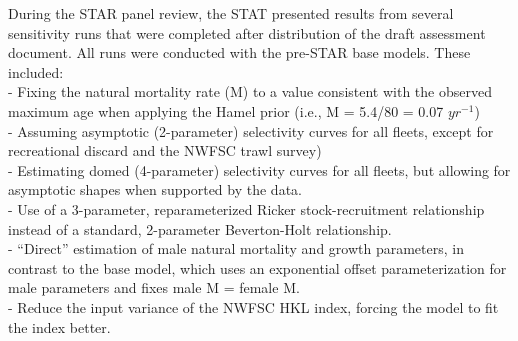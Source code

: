 \documentclass[
  english,
  a4paper,
]{article}
\begin{document}
During the STAR panel review, the STAT presented results from several sensitivity runs that were completed after distribution of the draft assessment document. All runs were conducted with the pre-STAR base models. These included:\\
- Fixing the natural mortality rate (M) to a value consistent with the observed maximum age when applying the Hamel prior (i.e., M = 5.4/80 = 0.07 \(yr^{-1}\))\\
- Assuming asymptotic (2-parameter) selectivity curves for all fleets, except for recreational discard and the NWFSC trawl survey)\\
- Estimating domed (4-parameter) selectivity curves for all fleets, but allowing for asymptotic shapes when supported by the data.\\
- Use of a 3-parameter, reparameterized Ricker stock-recruitment relationship instead of a standard, 2-parameter Beverton-Holt relationship.\\
- ``Direct'' estimation of male natural mortality and growth parameters, in contrast to the base model, which uses an exponential offset parameterization for male parameters and fixes male M = female M.\\
- Reduce the input variance of the NWFSC HKL index, forcing the model to fit the index better.
\end{document}

